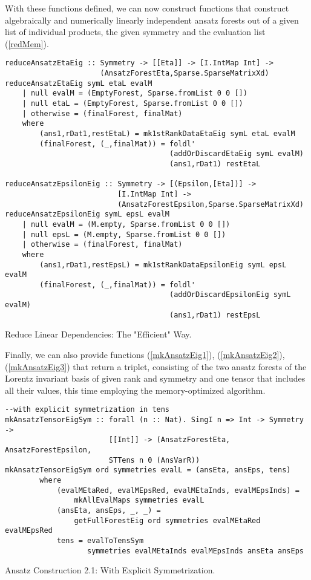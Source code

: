 With these functions defined, we can now construct functions that construct algebraically and numerically linearly independent ansatz forests out of a given list of individual products, the given symmetry and the evaluation list (\ref{redMem}).
\begin{listing}[hbt!]
\begin{verbatim}
reduceAnsatzEtaEig :: Symmetry -> [[Eta]] -> [I.IntMap Int] ->
                      (AnsatzForestEta,Sparse.SparseMatrixXd)
reduceAnsatzEtaEig symL etaL evalM
    | null evalM = (EmptyForest, Sparse.fromList 0 0 [])
    | null etaL = (EmptyForest, Sparse.fromList 0 0 [])
    | otherwise = (finalForest, finalMat)
    where
        (ans1,rDat1,restEtaL) = mk1stRankDataEtaEig symL etaL evalM
        (finalForest, (_,finalMat)) = foldl' 
                                      (addOrDiscardEtaEig symL evalM)
                                      (ans1,rDat1) restEtaL

reduceAnsatzEpsilonEig :: Symmetry -> [(Epsilon,[Eta])] ->
                          [I.IntMap Int] ->
                          (AnsatzForestEpsilon,Sparse.SparseMatrixXd)
reduceAnsatzEpsilonEig symL epsL evalM
    | null evalM = (M.empty, Sparse.fromList 0 0 [])
    | null epsL = (M.empty, Sparse.fromList 0 0 [])
    | otherwise = (finalForest, finalMat)
    where
        (ans1,rDat1,restEpsL) = mk1stRankDataEpsilonEig symL epsL evalM
        (finalForest, (_,finalMat)) = foldl'
                                      (addOrDiscardEpsilonEig symL evalM)
                                      (ans1,rDat1) restEpsL
\end{verbatim} 
\caption{Reduce Linear Dependencies: The "Efficient" Way.}\label{redMem}
\end{listing}
Finally, we can also provide functions (\ref{mkAnsatzEig1}), (\ref{mkAnsatzEig2}), (\ref{mkAnsatzEig3}) that return a triplet, consisting of the two ansatz forests of the Lorentz invariant basis of given rank and symmetry and one tensor that includes all their values, this time employing the memory-optimized algorithm. 
\begin{listing}[hbt!]
\begin{verbatim}
--with explicit symmetrization in tens
mkAnsatzTensorEigSym :: forall (n :: Nat). SingI n => Int -> Symmetry ->
                        [[Int]] -> (AnsatzForestEta, AnsatzForestEpsilon,
                        STTens n 0 (AnsVarR))
mkAnsatzTensorEigSym ord symmetries evalL = (ansEta, ansEps, tens)
        where
            (evalMEtaRed, evalMEpsRed, evalMEtaInds, evalMEpsInds) =
                mkAllEvalMaps symmetries evalL 
            (ansEta, ansEps, _, _) =
                getFullForestEig ord symmetries evalMEtaRed evalMEpsRed
            tens = evalToTensSym
                   symmetries evalMEtaInds evalMEpsInds ansEta ansEps
\end{verbatim} 
\caption{Ansatz Construction 2.1: With Explicit Symmetrization.}\label{mkAnsatzEig1}
\end{listing}
